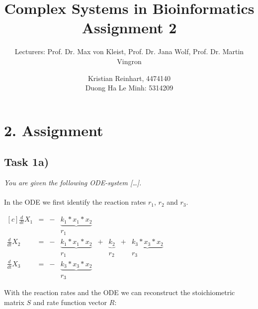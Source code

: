 \documentclass[]{scrartcl}
\title{Complex Systems in Bioinformatics \\ \vspace{2mm} Assignment 2 \\ \vspace{2mm}}
\subtitle{Lecturers: Prof. Dr. Max von Kleist, Prof. Dr. Jana Wolf, Prof. Dr. Martin Vingron}
\author{Kristian Reinhart, 4474140 \\ Duong Ha Le Minh: 5314209}
\begin{document}
\maketitle




\section*{2. Assignment}

\subsection*{Task 1a)}

\textit{You are given the following ODE-system [\dots].}
\\
\\
In the ODE we first identify the reaction rates $r_1$, $r_2$ and $r_3$.


\begin{center}
\noindent \begin{minipage}{.5\linewidth}
$
\begin{matrix*}[c]
	\frac{d}{dt} X_1 & = & - & \underbrace{k_1 * x_1 * x_2}	&	& 				   &   & \\ 
					 &   &   & 							r_1 &   &				   &   & \\
	\frac{d}{dt} X_2 & = & - & \underbrace{k_1 * x_1 * x_2}	& + & \underbrace{k_2} & + & \underbrace{k_3 * x_3 * x_2} \\
					 &   &   & 							r_1 &   &			   r_2 &   & 						  r_3 \\
	\frac{d}{dt} X_3 & = & - & \underbrace{k_3 * x_3 * x_2} &   &				   &   & \\
					 &   &   & 							r_3 &   &				   &   & 
\end{matrix*}
$
\end{minipage}
\end{center}

\noindent With the reaction rates and the ODE we can reconstruct the stoichiometric matrix $S$ and rate function vector $R$:
\end{document}
